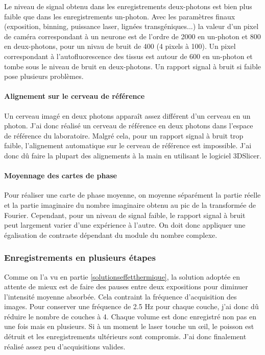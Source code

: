 Le niveau de signal obtenu dans les enregistrements deux-photons est bien plus faible que dans les enregistrements un-photon. Avec les paramètres finaux (exposition, binning, puissance laser, lignées transgéniques...) la valeur d'un pixel de caméra correspondant à un neurone est de l'ordre de 2000 en un-photon et 800 en deux-photons, pour un nivau de bruit de 400 (4 pixels à 100). Un pixel correspondant à l'autofluorescence des tissus est autour de 600 en un-photon et tombe sous le niveau de bruit en deux-photons. Un rapport signal à bruit si faible pose plusieurs problèmes.
\paragraph{Alignement sur le cerveau de référence}
Un cerveau imagé en deux photons apparaît assez différent d'un cerveau en un photon. J'ai donc réalisé un cerveau de référence en deux photons dans l'espace de référence du laboratoire. Malgré cela, pour un rapport signal à bruit trop faible, l'alignement automatique sur le cerveau de référence est impossible. J'ai donc dû faire la plupart des alignements à la main en utilisant le logiciel 3DSlicer.
\paragraph{Moyennage des cartes de phase}
Pour réaliser une carte de phase moyenne, on moyenne séparément la partie réelle et la partie imaginaire du nombre imaginaire obtenu au pic de la transformée de Fourier. Cependant, pour un niveau de signal faible, le rapport signal à bruit peut largement varier d'une expérience à l'autre. On doit donc appliquer une égalisation de contraste dépendant du module du nombre complexe.

\subsubsection{Enregistrements en plusieurs étapes}
Comme on l'a vu en partie \ref{solutionseffetthermique}, la solution adoptée en attente de mieux est de faire des pauses entre deux expositions pour diminuer l'intensité moyenne absorbée. Cela contraint la fréquence d'acquisition des images. Pour conserver une fréquence de 2.5 Hz pour chaque couche, j'ai donc dû réduire le nombre de couches à 4. Chaque volume est donc enregistré non pas en une fois mais en plusieurs. Si à un moment le laser touche un œil, le poisson est détruit et les enregistrements ultérieurs sont compromis. J'ai donc finalement réalisé assez peu d'acquisitions valides.

